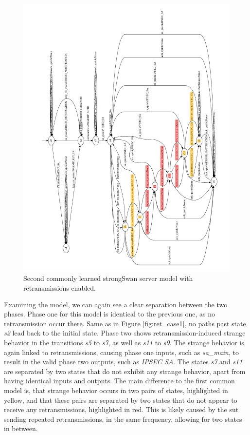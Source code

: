 \begin{figure}[H]
	\includegraphics[width=1.1\linewidth]{images/models/retransmissions/retrans_case2_lstar}
	\caption{Second commonly learned strongSwan server model with retransmissions enabled.}
	\label{fig:ret_case2}
\end{figure}

\newpage

Examining the model, we can again see a clear separation between the two phases. Phase one for this model is identical to the previous one, as no retransmission occur there. Same as in Figure \ref{fig:ret_case1}, no paths past state \emph{s2} lead back to the initial state. Phase two shows retransmission-induced strange behavior in the transitions \emph{s5} to \emph{s7}, as well as \emph{s11} to \emph{s9}. The strange behavior is again linked to retransmissions, causing phase one inputs, such as \emph{sa\_main}, to result in the valid phase two outputs, such as \emph{IPSEC SA}. The states \emph{s7} and \emph{s11} are separated by two states that do not exhibit any strange behavior, apart from having identical inputs and outputs. The main difference to the first common model is, that strange behavior occurs in two pairs of states, highlighted in yellow, and that these pairs are separated by two states that do not appear to receive any retransmissions, highlighted in red. This is likely caused by the \ac{sut} sending repeated retransmissions, in the same frequency, allowing for two states in between. 


